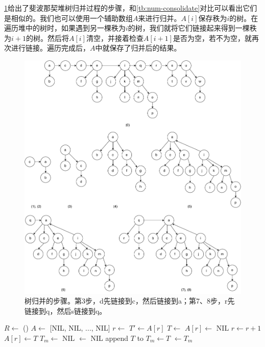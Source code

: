 \documentclass[b5paper]{ctexart}
\begin{document}
\cref{fig:fib-melt-b}给出了斐波那契堆树归并过程的步骤，和\cref{tb:num-consolidate}对比可以看出它们是相似的。我们也可以使用一个辅助数组$A$来进行归并。$A[i]$保存秩为$i$的树。在遍历堆中的树时，如果遇到另一棵秩为$i$的树，我们就将它们链接起来得到一棵秩为$i+1$的树。然后将$A[i]$清空，并接着检查$A[i+1]$是否为空，若不为空，就再次进行链接。遍历完成后，$A$中就保存了归并后的结果。

\captionsetup[subfigure]{labelformat=empty, margin=10pt}
\begin{figure}[htbp]
  \centering
  \includegraphics[scale=0.45]{img/fib-meld}
  \caption{树归并的步骤。第3步，d先链接到c，然后链接到a；第7、8步，r先链接到q，然后s链接到q。}
  \label{fig:fib-melt-b}
\end{figure}
\captionsetup[subfigure]{labelformat=parens}

\begin{algorithmic}[1]
  \State $R \gets $ ()
  \State $A \gets$ [NIL, NIL, ..., NIL] 
    \State $r \gets $ 
      \State $T' \gets A[r]$
      \State $T \gets $ 
      \State $A[r] \gets$ NIL
      \State $r \gets r + 1$
    \EndWhile
    \State $A[r] \gets T$
  \EndFor
  \State $T_m \gets$ NIL
  \State {} $\gets$ NIL
      \State append $T$ to 
        \State $T_m \gets T$
      \EndIf
    \EndIf
  \EndFor
  \State {} $\gets T_m$
\EndFunction
\end{algorithmic}
\end{document}
